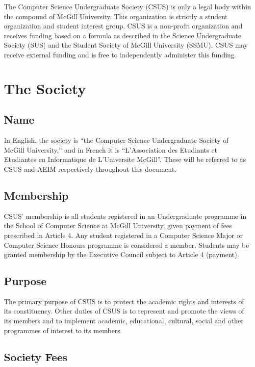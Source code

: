 The Computer Science Undergraduate Society (CSUS) is only a legal body
within the compound of McGill University. This organization is strictly
a student organization and student interest group. CSUS is a non-profit
organization and receives funding based on a formula as described in the
Science Undergraduate Society (SUS) and the Student Society of McGill
University (SSMU). CSUS may receive external funding and is free to
independently administer this funding.

\section{The Society}\label{the-society}

\subsection{Name}\label{name}

In English, the society is ``the Computer Science Undergraduate Society
of McGill University,'' and in French it is ``L'Association des
Etudiants et Etudiantes en Informatique de L'Universite McGill''. These
will be referred to as CSUS and AEIM respectively throughout this
document.

\subsection{Membership}\label{membership}

CSUS' membership is all students registered in an Undergraduate
programme in the School of Computer Science at McGill University, given
payment of fees prescribed in Article 4. Any student registered in a
Computer Science Major or Computer Science Honours programme is
considered a member. Students may be granted membership by the Executive
Council subject to Article 4 (payment).

\subsection{Purpose}\label{purpose}

The primary purpose of CSUS is to protect the academic rights and
interests of its constituency. Other duties of CSUS is to represent and
promote the views of its members and to implement academic, educational,
cultural, social and other programmes of interest to its members.

\subsection{Society Fees}\label{society-fees}

